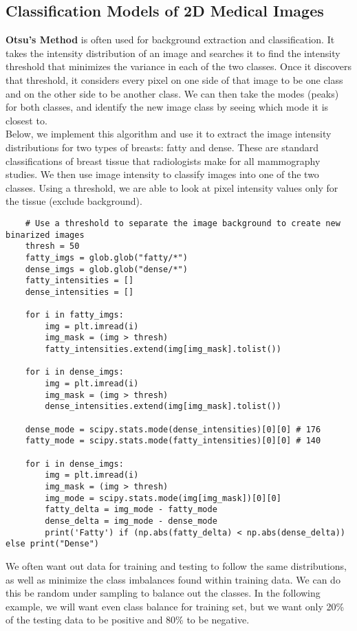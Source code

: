 \documentclass[11pt, a4paper]{article}
\begin{document}
	\subsection{Classification Models of 2D Medical Images}
	\textbf{Otsu's Method} is often used for background extraction and classification. It takes the intensity distribution of an image and searches it to find the intensity threshold that minimizes the variance in each of the two classes. Once it discovers that threshold, it considers every pixel on one side of that image to be one class and on the other side to be another class. We can then take the modes (peaks) for both classes, and identify the new image class by seeing which mode it is closest to. \vspace*{3mm}\\
	Below, we implement this algorithm and use it to extract the image intensity distributions for two types of breasts: fatty and dense. These are standard classifications of breast tissue that radiologists make for all mammography studies. We then use image intensity to classify images into one of the two classes. Using a threshold, we are able to look at pixel intensity values only for the tissue (exclude background).\vspace*{1mm}
	\begin{lstlisting}
	# Use a threshold to separate the image background to create new binarized images
	thresh = 50
	fatty_imgs = glob.glob("fatty/*")
	dense_imgs = glob.glob("dense/*")
	fatty_intensities = []
	dense_intensities = []
	
	for i in fatty_imgs: 
		img = plt.imread(i)
		img_mask = (img > thresh)
		fatty_intensities.extend(img[img_mask].tolist())
	
	for i in dense_imgs: 
		img = plt.imread(i)
		img_mask = (img > thresh)
		dense_intensities.extend(img[img_mask].tolist())
		
	dense_mode = scipy.stats.mode(dense_intensities)[0][0] # 176
	fatty_mode = scipy.stats.mode(fatty_intensities)[0][0] # 140
	
	for i in dense_imgs: 
		img = plt.imread(i)
		img_mask = (img > thresh)
		img_mode = scipy.stats.mode(img[img_mask])[0][0]
		fatty_delta = img_mode - fatty_mode
		dense_delta = img_mode - dense_mode
		print('Fatty') if (np.abs(fatty_delta) < np.abs(dense_delta)) else print("Dense")\end{lstlisting}\vspace*{1mm}
	We often want out data for training and testing to follow the same distributions, as well as minimize the class imbalances found within training data. We can do this be random under sampling to balance out the classes. In the following example, we will want even class balance for training set, but we want only 20\% of the testing data to be positive and 80\% to be negative. \vspace*{1mm}
\end{document}
